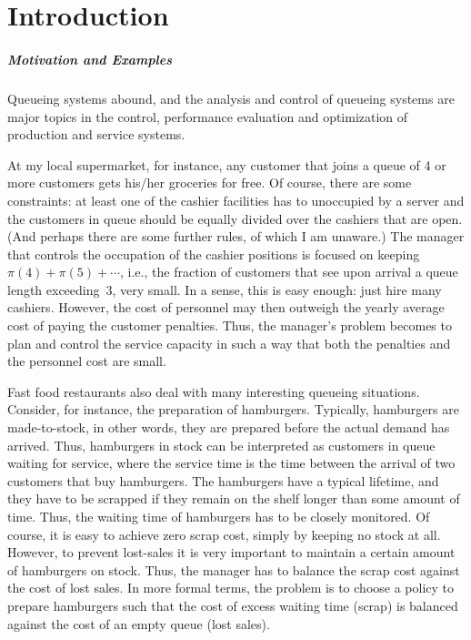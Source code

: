 \chapter*{Introduction}\label{sec:introduction}

\paragraph{Motivation and Examples}
Queueing systems abound, and the analysis and control of queueing
systems are major topics in the control, performance evaluation and
optimization of production and service systems. 


At my local supermarket, for instance, any customer that joins a queue
of 4 or more customers gets his/her groceries for free. Of course, there
are some constraints: at least one of the cashier facilities has to
unoccupied by a server and the customers in queue should be equally
divided over the cashiers that are open. (And perhaps there are some
further rules, of which I am unaware.) The manager that controls the
occupation of the cashier positions is focused on keeping
$\pi(4)+\pi(5)+\cdots$, i.e., the fraction of customers that see upon
arrival a queue length exceeding~3, very small. In a sense,
this is easy enough: just hire many cashiers. However, the cost of
personnel may then outweigh the yearly average cost of paying the
customer penalties. Thus, the manager's problem becomes to plan and
control the service capacity  in such a way that both
the penalties and the personnel cost are small.

Fast food restaurants also deal with many interesting queueing
situations. Consider, for instance, the preparation of
hamburgers. Typically, hamburgers are made-to-stock, in other words,
they are prepared before the actual demand has arrived. Thus, hamburgers
in stock can be interpreted as customers in queue waiting for service,
where the service time is the time between the arrival of two
customers that buy hamburgers. The hamburgers have a typical lifetime,
and they have to be scrapped if they remain on the shelf longer than
some amount of time. Thus, the waiting time of hamburgers has to be
closely monitored. Of course, it is easy to achieve zero scrap cost,
simply by keeping no stock at all.  However, to prevent lost-sales it
is very important to maintain a certain amount of hamburgers on
stock. Thus, the manager has to balance the scrap cost against the
cost of lost sales. In more formal terms, the problem is to choose a
policy to prepare hamburgers such that the cost of excess waiting time
(scrap) is balanced against the cost of an empty queue (lost sales).

